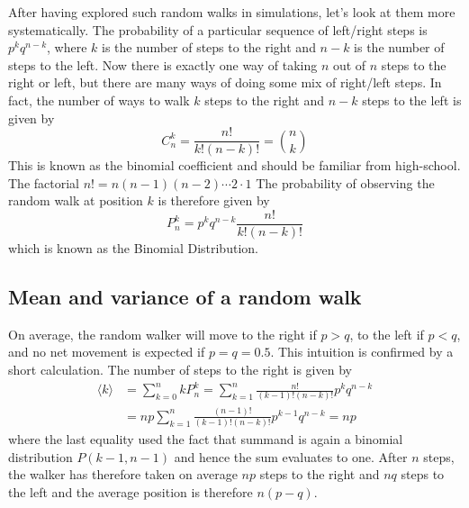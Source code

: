 After having explored such random walks in simulations, let's look at them more systematically.
The probability of a particular sequence of left/right steps is $p^k q^{n-k}$, where $k$ is the number of steps to the right and $n-k$ is the number of steps to the left.
Now there is exactly one way of taking $n$ out of $n$ steps to the right or left, but there are many ways of doing some mix of right/left steps.
In fact, the number of ways to walk $k$ steps to the right and $n-k$ steps to the left is given by
\begin{equation}
	C_n^k = \frac{n!}{k!(n-k)!} = { n\choose k}
\end{equation}
This is known as the binomial coefficient and should be familiar from high-school.
The factorial $n! = n(n-1)(n-2)\cdots 2\cdot1$
The probability of observing the random walk at position $k$ is therefore given by
\begin{equation}
	P_n^k = p^kq^{n-k}\frac{n!}{k!(n-k)!}
\end{equation}
which is known as the Binomial Distribution.

\subsection{Mean and variance of a random walk}
On average, the random walker will move to the right if $p>q$, to the left if $p<q$, and no net movement is expected if $p=q=0.5$.
This intuition is confirmed by a short calculation.
The number of steps to the right is given by
\begin{equation}
\begin{split}
	\langle k \rangle & = \sum_{k=0}^n k P_n^k = \sum_{k=1}^n \frac{n!}{(k-1)! (n-k)!} p^k q^{n-k} \\
	&= np \sum_{k=1}^n \frac{(n-1)!}{(k-1)! (n-k)!} p^{k-1} q^{n-k} = np
\end{split}
\end{equation}
where the last equality used the fact that summand is again a binomial distribution $P(k-1, n-1)$ and hence the sum evaluates to one.
After $n$ steps, the walker has therefore taken on average $np$ steps to the right and $nq$ steps to the left and the average position is therefore $n(p-q)$.

